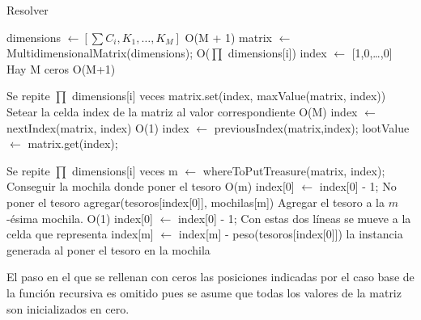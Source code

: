 \begin{algorithm}[H]
\caption{Resolver}
\begin{algorithmic}[1]

  	\State	dimensions $\gets\left[\sum C_i, K_1, \dots, K_M\right]$  \Comment O(M + 1)
	\State	matrix $\gets$ MultidimensionalMatrix(dimensions);	 \Comment O($\prod$ dimensions[i])
    \State  index $\gets$ [1,0,\dots,0]  \Comment Hay M ceros O(M+1)
    
     \Comment Se repite $\prod$ dimensions[i] veces
		\State	matrix.set(index, maxValue(matrix, index)) \Comment Setear la celda index de la  matriz al 
		\State  \Comment valor correspondiente O(M)
		\State	index $\gets$ nextIndex(matrix, index) \Comment O(1)
	\EndWhile
	\State	index $\gets$ previousIndex(matrix,index);
	\State	lootValue $\gets$ matrix.get(index);
	
		 \Comment Se repite $\prod$ dimensions[i] veces
		\State	m $\gets$ whereToPutTreasure(matrix, index); \Comment Conseguir la mochila donde poner el tesoro O(m)
			\State	index[0] $\gets$ index[0] - 1; \Comment No poner el tesoro
        \Else	
			\State agregar(tesoros[index[0]], mochilas[m]) \Comment Agregar el tesoro a la $m$-ésima mochila. O(1)
			\State	index[0] $\gets$ index[0] - 1; \Comment Con estas dos líneas se mueve a la celda que representa
			\State	index[m] $\gets$ index[m] - peso(tesoros[index[0]]) \Comment la instancia generada al poner el 
			\State \Comment tesoro en la mochila
		\EndIf
    \EndWhile
\EndProcedure
\end{algorithmic}
\end{algorithm}

El paso en el que se rellenan con ceros las posiciones indicadas por el caso base de la función recursiva es omitido pues se asume que todas los valores de la matriz son inicializados en cero.

